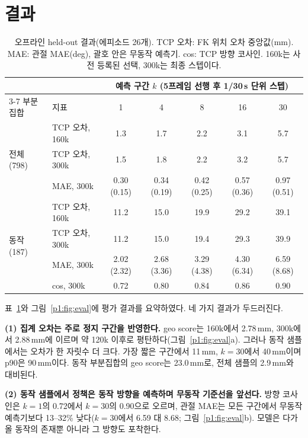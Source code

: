 \documentclass[conference,10pt]{IEEEtran}
\newcommand{\mm}{\,mm\xspace}
\begin{document}
\section{결과}\label{p1:sec:results}
\begin{table}[t]
\centering\footnotesize
\setlength{\tabcolsep}{7pt}
\caption{오프라인 held-out 결과(에피소드 26개). TCP 오차: FK 위치 오차 중앙값(mm). MAE: 관절 MAE(deg), 괄호 안은 무동작 예측기.
cos: TCP 방향 코사인. 160k는 사전 등록된 선택, 300k는 최종 스텝이다.}
\label{p1:tab:results}
\begin{tabular}{@{}llccccc@{}}
\toprule
 & & \multicolumn{5}{c}{예측 구간 $k$ (5프레임 선행 후 1/30\,s 단위 스텝)} \\
\cmidrule(l){3-7}
부분집합 & 지표 & 1 & 4 & 8 & 16 & 30 \\
\midrule
\multirow{3}{*}{전체 (798)} & TCP 오차, 160k & 1.3 & 1.7 & 2.2 & 3.1 & 5.7 \\
 & TCP 오차, 300k & 1.5 & 1.8 & 2.2 & 3.2 & 5.7 \\
 & MAE, 300k & 0.30 (0.15) & 0.34 (0.19) & 0.42 (0.25) & 0.57 (0.36) & 0.97 (0.51) \\
\midrule
\multirow{4}{*}{동작 (187)} & TCP 오차, 160k & 11.2 & 15.0 & 19.9 & 29.2 & 39.1 \\
 & TCP 오차, 300k & 11.2 & 15.0 & 19.4 & 29.3 & 39.9 \\
 & MAE, 300k & 2.02 (2.32) & 2.68 (3.36) & 3.29 (4.38) & 4.30 (6.34) & 6.59 (8.68) \\
 & cos, 300k & 0.72 & 0.80 & 0.84 & 0.86 & 0.90 \\
\bottomrule
\end{tabular}
\end{table}

표~\ref{p1:tab:results}와 그림~\ref{p1:fig:eval}에 평가 결과를 요약하였다. 네 가지 결과가 두드러진다.

\textbf{(1) 집계 오차는 주로 정지 구간을 반영한다.} geo score는 160k에서 2.78\mm, 300k에서 2.88\mm{}에 이르며 약 120k 이후로
평탄하다(그림~\ref{p1:fig:eval}a). 그러나 동작 샘플에서는 오차가 한 자릿수 더 크다. 가장 짧은 구간에서 11\mm, $k{=}30$에서 40\mm{}이며
p90은 90\mm{}이다. 동작 부분집합의 geo score는 23.0\mm{}로, 전체 샘플의 2.9\mm{}와 대비된다.

\textbf{(2) 동작 샘플에서 정책은 동작 방향을 예측하며 무동작 기준선을 앞선다.} 방향 코사인은 $k{=}1$의 0.72에서 $k{=}30$의 0.90으로
오르며, 관절 MAE는 모든 구간에서 무동작 예측기보다 13--32\% 낮다($k{=}30$에서 6.59 대 8.68\textdegree{}; 그림~\ref{p1:fig:eval}b).
모델은 다가올 동작의 존재뿐 아니라 그 방향도 포착한다.
\end{document}
